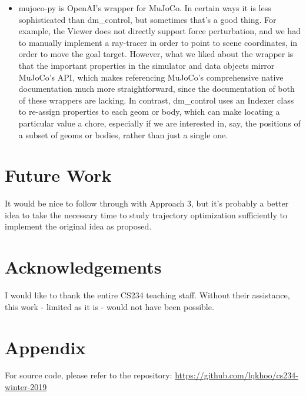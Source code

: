 \documentclass{article}
\begin{document}
\begin{itemize}
	\item mujoco-py is OpenAI's wrapper for MuJoCo. In certain ways it is less sophisticated than dm\_control, but sometimes that's a good thing. For example, the Viewer does not directly support force perturbation, and we had to manually implement a ray-tracer in order to point to scene coordinates, in order to move the goal target. However, what we liked about the wrapper is that the important properties in the simulator and data objects mirror MuJoCo's API, which makes referencing MuJoCo's comprehensive native documentation much more straightforward, since the documentation of both of these wrappers are lacking. In contrast, dm\_control uses an Indexer class to re-assign properties to each geom or body, which can make locating a particular value a chore, especially if we are interested in, say, the positions of a subset of geoms or bodies, rather than just a single one.
\end{itemize}

\section{Future Work}
It would be nice to follow through with Approach 3, but it's probably a better idea to take the necessary time to study trajectory optimization sufficiently to implement the original idea as proposed.

\section{Acknowledgements}
I would like to thank the entire CS234 teaching staff. Without their assistance, this work - limited as it is - would not have been possible.

\section{Appendix}
For source code, please refer to the repository: \href{https://github.com/lqkhoo/cs234-winter-2019}{https://github.com/lqkhoo/cs234-winter-2019}

\newpage





\end{document}
